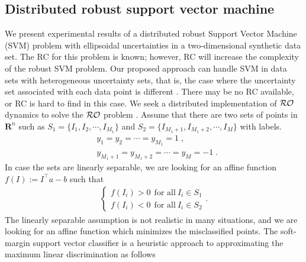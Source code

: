 \documentclass[journal,twoside,web]{ieeecolor}
\begin{document}
\iffalse\subsection{Distributed robust support vector machine}
We present experimental results of a distributed robust Support Vector Machine (SVM) problem with ellipsoidal uncertainties in a two-dimensional synthetic data set. The RC for this problem is known; however, RC will increase the complexity of the robust SVM problem. Our proposed approach can handle SVM in data sets with heterogeneous uncertainty sets, that is, the case where the uncertainty set associated with each data point is different \cite{ebrahimi2019cdc}. There may be no RC available, or RC is hard to find in this case. We seek a distributed implementation of ${\cal RO}$ dynamics to solve the ${\cal RO}$ problem
\cite{vapnik1995}. 
Assume that there are two sets of points in $\mathbf{R}^n$ such as $S_1=\{I_1,I_2,\cdots,I_{M_1}\}$ and $S_2=\{I_{M_1+1},I_{M_1+2},\cdots,I_{M}\}$ with labels. 
\begin{align*}
& y_1=y_2=\cdots=y_{M_1}=1\;,\\
& y_{M_1+1}=y_{M_1+2}=\cdots=y_{M}=-1\;.
\end{align*}
In case the sets are linearly separable, we are looking for an affine function $f(I):=I^\top a-b$ such that
\begin{align*}
\left\{\begin{array}{ccl}f(I_i)>0 \ \ \text{for all} \ I_i \in S_1\\f(I_i)<0 \ \ \text{for all} \ I_i \in S_2 \end{array}\right..
\end{align*}
The linearly separable assumption is not realistic in many situations, and we are looking for an affine function which minimizes the misclassified points. The soft-margin support vector classifier is a heuristic approach to approximating the maximum linear discrimination as follows \cite[Chap~8]{boyd2004}
\end{document}
